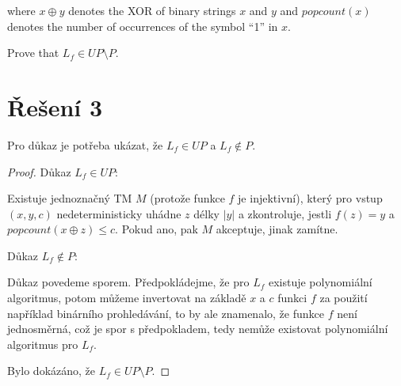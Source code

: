 \documentclass[a4paper, 11pt, fleqn]{scrartcl}
\begin{document}
    where $x \oplus y$ denotes the XOR of binary strings $x$ and $y$ and $\mathit{popcount}(x)$ denotes the number of occurrences of the symbol “1” in $x$.

    Prove that $L_f \in UP \setminus P$.

  \section*{Řešení 3}
    Pro důkaz je potřeba ukázat, že $L_f \in \mathit{UP}$ a $L_f \notin \mathit{P}$.

    \begin{proof}
      Důkaz $L_f \in \mathit{UP}$:

      \begin{adjustwidth}{1em}{0em}
        Existuje jednoznačný TM $M$ (protože funkce $f$ je injektivní), který pro vstup $(x, y, c)$ nedeterministicky uhádne $z$ délky $|y|$ a zkontroluje, jestli $f(z) = y$ a $\mathit{popcount}(x \oplus z) \leq c$. Pokud ano, pak $M$ akceptuje, jinak zamítne.
      \end{adjustwidth}

      \vspace{0.5cm}

      Důkaz $L_f \notin \mathit{P}$:

      \begin{adjustwidth}{1em}{0em}
        Důkaz povedeme sporem. Předpokládejme, že pro $L_f$ existuje polynomiální algoritmus, potom můžeme invertovat na základě $x$ a $c$ funkci $f$ za použití například binárního prohledávání, to by ale znamenalo, že funkce $f$ není jednosměrná, což je spor s předpokladem, tedy nemůže existovat polynomiální algoritmus pro $L_f$.
      \end{adjustwidth}

      Bylo dokázáno, že $L_f \in UP\setminus P$.

    \end{proof}
\end{document}
